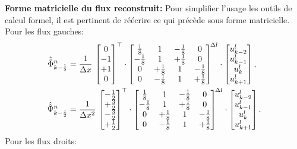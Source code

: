 \textbf{Forme matricielle du flux reconstruit: }
Pour simplifier l'usage les outils de calcul formel, il est pertinent de réécrire ce qui précède sous forme matricielle.\\
Pour les flux gauches:
\begin{align}
\hat{\hat{\Phi}}_{k-\frac12}^n
&= \frac{1}{\Delta x}\,
\begin{bmatrix}0 \\ -1 \\ +1 \\ 0\end{bmatrix}^\top \cdot
\begin{bmatrix}
\frac{1}{8} & 1 & -\frac{1}{8} & 0\\
-\frac{1}{8} & 1 & +\frac{1}{8} & 0\\
0 & +\frac{1}{8} & 1 & -\frac{1}{8}\\
0 & -\frac{1}{8} & 1 & +\frac{1}{8}
\end{bmatrix}^{\!\Delta l} \cdot
\begin{bmatrix}
u^l_{k-2}\\ u^l_{k-1}\\ u^l_{k}\\ u^l_{k+1}
\end{bmatrix},\\
\hat{\hat{\Psi}}_{k-\frac12}^n
&= \frac{1}{\Delta x^2}\,
\begin{bmatrix}-\tfrac12 \\ +\tfrac32 \\ -\tfrac32 \\ +\tfrac12\end{bmatrix}^\top \cdot
\begin{bmatrix}
\frac{1}{8} & 1 & -\frac{1}{8} & 0\\
-\frac{1}{8} & 1 & +\frac{1}{8} & 0\\
0 & +\frac{1}{8} & 1 & -\frac{1}{8}\\
0 & -\frac{1}{8} & 1 & +\frac{1}{8}
\end{bmatrix}^{\!\Delta l} \cdot
\begin{bmatrix}
u^l_{k-2}\\ u^l_{k-1}\\ u^l_{k}\\ u^l_{k+1}
\end{bmatrix}.
\end{align}
Pour les flux droits:
